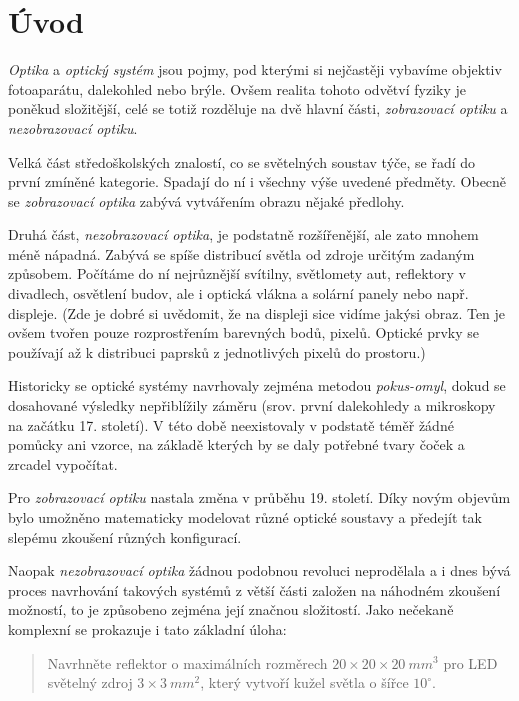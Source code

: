 \chapter{Úvod}


\emph{Optika} a \emph{optický systém} jsou pojmy, pod kterými si nejčastěji vybavíme objektiv fotoaparátu, dalekohled nebo brýle. Ovšem realita tohoto odvětví fyziky je poněkud složitější, celé se totiž rozděluje na dvě hlavní části, \emph{zobrazovací optiku} a \emph{nezobrazovací optiku}.

Velká část středoškolských znalostí, co se světelných soustav týče, se řadí do první zmíněné kategorie. Spadají do ní i všechny výše uvedené předměty. Obecně se \emph{zobrazovací optika} zabývá vytvářením obrazu nějaké předlohy.

Druhá část, \emph{nezobrazovací optika}, je podstatně rozšířenější, ale zato mnohem méně nápadná. Zabývá se spíše distribucí světla od zdroje určitým zadaným způsobem. Počítáme do ní nejrůznější svítilny, světlomety aut, reflektory v divadlech, osvětlení budov, ale i optická vlákna a solární panely nebo např. displeje. (Zde je dobré si uvědomit, že na displeji sice vidíme jakýsi obraz. Ten je ovšem tvořen pouze rozprostřením barevných bodů, pixelů. Optické prvky se používají až k distribuci paprsků z jednotlivých pixelů do prostoru.)

Historicky se optické systémy navrhovaly zejména metodou \emph{pokus-omyl}, dokud se dosahované výsledky nepřiblížily záměru (srov. první dalekohledy a mikroskopy na začátku 17. století). V této době neexistovaly v podstatě téměř žádné pomůcky ani vzorce, na základě kterých by se daly potřebné tvary čoček a zrcadel vypočítat. 

Pro \emph{zobrazovací optiku} nastala změna v průběhu 19. století. Díky novým objevům bylo umožněno matematicky modelovat různé optické soustavy a předejít tak slepému zkoušení různých konfigurací.\src

Naopak \emph{nezobrazovací optika} žádnou podobnou revoluci neprodělala a i dnes bývá proces navrhování takových systémů z větší části založen na náhodném zkoušení možností, to je způsobeno zejména její značnou složitostí. Jako nečekaně komplexní se prokazuje i tato základní úloha:

\begin{quote}
    Navrhněte reflektor o maximálních rozměrech $20\times20\times20\ mm^3$ pro LED světelný zdroj $3\times3\ mm^2$, který vytvoří kužel světla o šířce $10^{\circ}$.

\end{quote}

